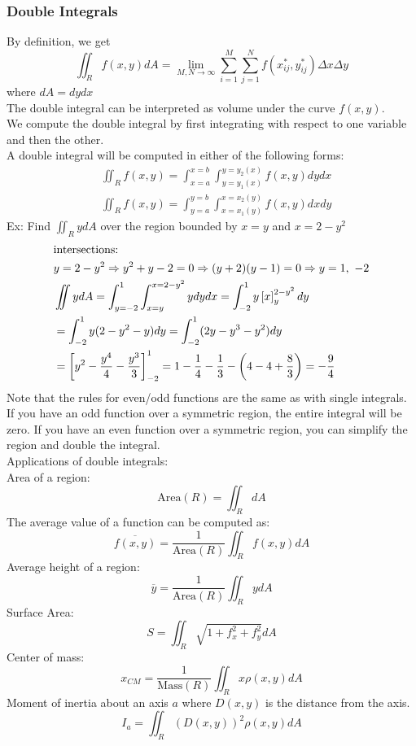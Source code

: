 \documentclass[11pt, fleqn]{article}
\begin{document}
\subsubsection{Double Integrals}
By definition, we get
$$\iint_Rf(x,y)dA=\lim_{M,N\to\infty}\sum_{i=1}^M\sum_{j=1}^Nf(x_{ij}^*,y_{ij}^*)\Delta x\Delta y$$
where $dA=dydx$\\
The double integral can be interpreted as volume under the curve $f(x,y)$.\\
We compute the double integral by first integrating with respect to one variable and then the other.\\
A double integral will be computed in either of the following forms:
\begin{align*}
    &\iint_Rf(x,y)=\int_{x=a}^{x=b}\int_{y=y_1(x)}^{y=y_2(x)}f(x,y)dydx\\
    &\iint_Rf(x,y)=\int_{y=a}^{y=b}\int_{x=x_1(y)}^{x=x_2(y)}f(x,y)dxdy
\end{align*}
Ex: Find $\iint_R ydA$ over the region bounded by $x=y$ and $x=2-y^2$
\begin{align*}
    &\text{intersections: }\\
    &y=2-y^2\Rightarrow y^2+y-2=0\Rightarrow (y+2)(y-1)=0\Rightarrow y=1,\ -2\\
    &\iint ydA=\int_{y=-2}^1\int_{x=y}^{x=2-y^2}ydydx=\int_{-2}^1y\left[ x \right]_y^{2-y^2}dy\\
    &=\int_{-2}^1y(2-y^2-y)dy=\int_{-2}^1(2y-y^3-y^2)dy\\
    &=\left[ y^2-\frac{y^4}{4}-\frac{y^3}{3} \right]_{-2}^1=1-\frac{1}{4}-\frac{1}{3}-\left( 4-4+\frac{8}{3} \right)=-\frac{9}{4}
\end{align*}
Note that the rules for even/odd functions are the same as with single integrals. If you have an odd function over a symmetric region, the entire integral will be zero. If you have an even function over a symmetric region, you can simplify the region and double the integral.\\
Applications of double integrals:\\
Area of a region:
$$\text{Area}(R)=\iint_RdA$$
The average value of a function can be computed as:
$$\overline{f(x,y)}=\frac{1}{\text{Area}(R)}\iint_Rf(x,y)dA$$
Average height of a region:
$$\overline{y}=\frac{1}{\text{Area}(R)}\iint_RydA$$
Surface Area:
$$S=\iint_R\sqrt{1+f_x^2+f_y^2}dA$$
Center of mass:
$$x_{CM}=\frac{1}{\text{Mass}(R)}\iint_R x\rho(x,y)dA$$
Moment of inertia about an axis $a$ where $D(x,y)$ is the distance from the axis.
$$I_a=\iint_R(D(x,y))^2\rho(x,y)dA$$
\end{document}
